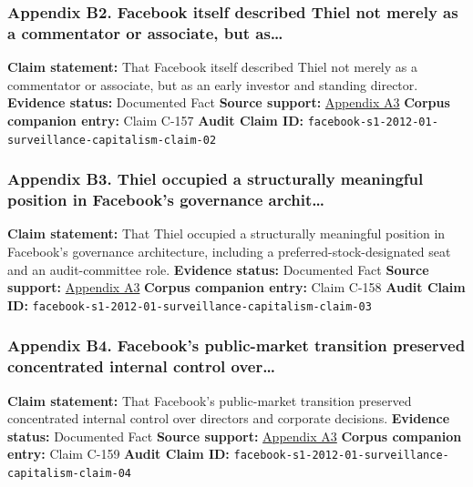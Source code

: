 \documentclass[
  american,
  11pt,
  letterpaper,
]{article}
\begin{document}
\subsubsection{Appendix B2. Facebook itself described Thiel not merely
as a commentator or associate, but
as\ldots{}}\label{appendix-b2-facebook-itself-described-thiel-not-merely-as-a-commentator-or-associate-but-as}

\textbf{Claim statement:} That Facebook itself described Thiel not
merely as a commentator or associate, but as an early investor and
standing director. \textbf{Evidence status:} Documented Fact
\textbf{Source support:}
\hyperref[appendix-a3-facebook-inc-registration-statement-on-form-s-1]{Appendix
A3} \textbf{Corpus companion entry:} Claim C-157 \textbf{Audit Claim
ID:} \texttt{facebook-s1-2012-01-surveillance-capitalism-claim-02}

\subsubsection{Appendix B3. Thiel occupied a structurally meaningful
position in Facebook's governance
archit\ldots{}}\label{appendix-b3-thiel-occupied-a-structurally-meaningful-position-in-facebook-s-governance-archit}

\textbf{Claim statement:} That Thiel occupied a structurally meaningful
position in Facebook's governance architecture, including a
preferred-stock-designated seat and an audit-committee role.
\textbf{Evidence status:} Documented Fact \textbf{Source support:}
\hyperref[appendix-a3-facebook-inc-registration-statement-on-form-s-1]{Appendix
A3} \textbf{Corpus companion entry:} Claim C-158 \textbf{Audit Claim
ID:} \texttt{facebook-s1-2012-01-surveillance-capitalism-claim-03}

\subsubsection{Appendix B4. Facebook's public-market transition
preserved concentrated internal control
over\ldots{}}\label{appendix-b4-facebook-s-public-market-transition-preserved-concentrated-internal-control-over}

\textbf{Claim statement:} That Facebook's public-market transition
preserved concentrated internal control over directors and corporate
decisions. \textbf{Evidence status:} Documented Fact \textbf{Source
support:}
\hyperref[appendix-a3-facebook-inc-registration-statement-on-form-s-1]{Appendix
A3} \textbf{Corpus companion entry:} Claim C-159 \textbf{Audit Claim
ID:} \texttt{facebook-s1-2012-01-surveillance-capitalism-claim-04}
\end{document}
